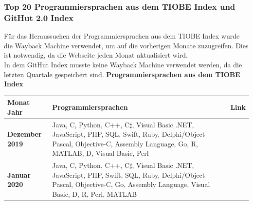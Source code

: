 \documentclass[ngerman]{article}
\begin{document}
    \subsubsection{Top 20 Programmiersprachen aus dem TIOBE Index und GitHut 2.0 Index}
    \label{GrundlagenTIOBEGitHutIndex}
    Für das Heraussuchen der Programmiersprachen aus dem TIOBE Index wurde die Wayback Machine verwendet, um auf die vorherigen Monate zuzugreifen. Dies ist notwendig, da die Webseite jeden Monat aktualisiert wird.\\
    In dem GitHut Index musste keine Wayback Machine verwendet werden, da die letzten Quartale gespeichert sind.
    \textbf{Programmiersprachen aus dem TIOBE Index}\\
    \label{GrundlagenLanguageTIOBE}
    \begin{tabularx}{\textwidth}{|l|X|c|}
        \hline
        \textbf{Monat Jahr}&\textbf{Programmiersprachen}&\textbf{Link}\\
        \hline
        \textbf{Dezember 2019}&Java, C, Python, C++, C$\sharp$, Visual Basic .NET, JavaScript, PHP, SQL, Swift, Ruby, Delphi/Object Pascal, Objective-C, Assembly Language, Go, R, MATLAB, D, Visual Basic, Perl&\cite{TIOBE Index 12.2019}\\
        \hline
        \textbf{Januar 2020}&Java, C, Python, C++, C$\sharp$, Visual Basic .NET, JavaScript, PHP, Swift, SQL, Ruby, Delphi/Object Pascal, Objective-C, Go, Assembly Language, Visual Basic, D, R, Perl, MATLAB&\cite{TIOBE Index 01.2020}\\
    \end{tabularx}\newpage
\end{document}

